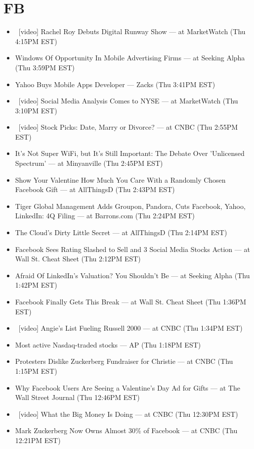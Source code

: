 \documentclass[11pt,asymmetric]{article}
\begin{document}
\section*{FB}
\begin{itemize}
\item\ [video] Rachel Roy Debuts Digital Runway Show --- at MarketWatch (Thu 4:15PM EST)
\item Windows Of Opportunity In Mobile Advertising Firms --- at Seeking Alpha (Thu 3:59PM EST)
\item Yahoo Buys Mobile Apps Developer --- Zacks (Thu 3:41PM EST)
\item\ [video] Social Media Analysis Comes to NYSE --- at MarketWatch (Thu 3:10PM EST)
\item\ [video] Stock Picks: Date, Marry or Divorce? --- at CNBC (Thu 2:55PM EST)
\item It's Not Super WiFi, but It's Still Important: The Debate Over 'Unlicensed Spectrum' --- at Minyanville (Thu 2:45PM EST)
\item Show Your Valentine How Much You Care With a Randomly Chosen Facebook Gift --- at AllThingsD (Thu 2:43PM EST)
\item Tiger Global Management Adds Groupon, Pandora, Cuts Facebook, Yahoo, LinkedIn: 4Q Filing --- at Barrons.com (Thu 2:24PM EST)
\item The Cloud’s Dirty Little Secret --- at AllThingsD (Thu 2:14PM EST)
\item Facebook Sees Rating Slashed to Sell and 3 Social Media Stocks Action --- at Wall St. Cheat Sheet (Thu 2:12PM EST)
\item Afraid Of LinkedIn's Valuation? You Shouldn't Be --- at Seeking Alpha (Thu 1:42PM EST)
\item Facebook Finally Gets This Break --- at Wall St. Cheat Sheet (Thu 1:36PM EST)
\item\ [video] Angie's List Fueling Russell 2000 --- at CNBC (Thu 1:34PM EST)
\item Most active Nasdaq-traded stocks --- AP (Thu 1:18PM EST)
\item Protesters Dislike Zuckerberg Fundraiser for Christie --- at CNBC (Thu 1:15PM EST)
\item Why Facebook Users Are Seeing a Valentine's Day Ad for Gifts --- at The Wall Street Journal (Thu 12:46PM EST)
\item\ [video] What the Big Money Is Doing --- at CNBC (Thu 12:30PM EST)
\item Mark Zuckerberg Now Owns Almost 30\% of Facebook --- at CNBC (Thu 12:21PM EST)

\end{itemize}
\end{document}

